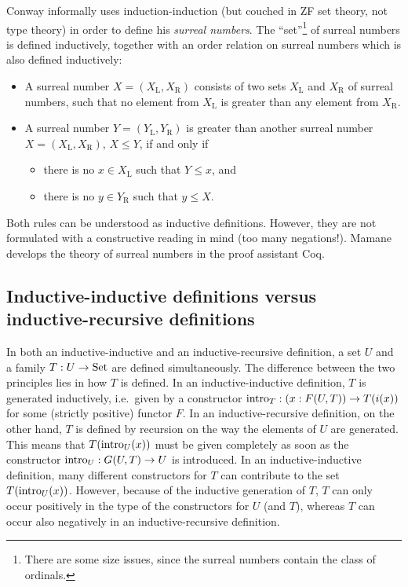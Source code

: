 \documentclass{article}
\begin{document}
\begin{example}
\label{ex:surreal}

Conway \cite{conway2001ONAG} informally uses induction-induction (but
couched in ZF set theory, not type theory) in order to define his
\emph{surreal numbers}. The ``set''\footnote{There are some size
  issues, since the surreal numbers contain the class of ordinals.} of
surreal numbers is defined inductively, together with an order
relation on surreal numbers which is also defined inductively:

\begin{itemize}
\item A surreal number $X = (X_\mathrm{L}, X_\mathrm{R})$ consists of
  two sets $X_\mathrm{L}$ and $X_\mathrm{R}$ of surreal numbers, such
  that no element from $X_\mathrm{L}$ is greater than any element from
  $X_\mathrm{R}$.
\item A surreal number $Y = (Y_\mathrm{L}, Y_\mathrm{R})$ is greater
  than another surreal number $X = (X_\mathrm{L}, X_\mathrm{R})$, $X \leq Y$, if and
  only if
  \begin{itemize}
  \item there is no $x \in X_\mathrm{L}$ such that $Y \leq x$, and
  \item there is no $y \in Y_\mathrm{R}$ such that $y \leq X$.
  \end{itemize}
\end{itemize}

Both rules can be understood as inductive definitions. However, they
are not formulated with a constructive reading in mind (too many
negations!). Mamane~\cite{mamane2004surrealCoq} develops the theory of
surreal numbers in the proof assistant Coq. %
\blackqed
\end{example}


\subsection{Inductive-inductive definitions versus inductive-recursive definitions}
\label{sec:indind-vs-IR}


In both an inductive-inductive and an inductive-recursive definition,
a set $U$ and a family $T : U \to \text{Set}$ are defined
simultaneously. The difference between the two principles lies in how
$T$ is defined. In an inductive-inductive definition, $T$ is generated
inductively, i.e.\ given by a constructor $\text{intro}_{T} : (x : F(U, T))
\to T(i(x))$ for some (strictly positive) functor
$F$. %
In an inductive-recursive definition, on the other hand, $T$ is
defined by recursion on the way the elements of $U$ are
generated. This means that $T(\text{intro}_{U}(x))$ must be given completely
as soon as the constructor $\text{intro}_{U} : G(U, T) \to U$ is
introduced. In an inductive-inductive definition, many different
constructors for $T$ can contribute to the set $T(\text{intro}_{U}(x))$.
However, because of the inductive generation of $T$, $T$ can only
occur positively in the type of the constructors for $U$ (and $T$),
whereas $T$ can occur also negatively in an inductive-recursive
definition.
\end{document}
